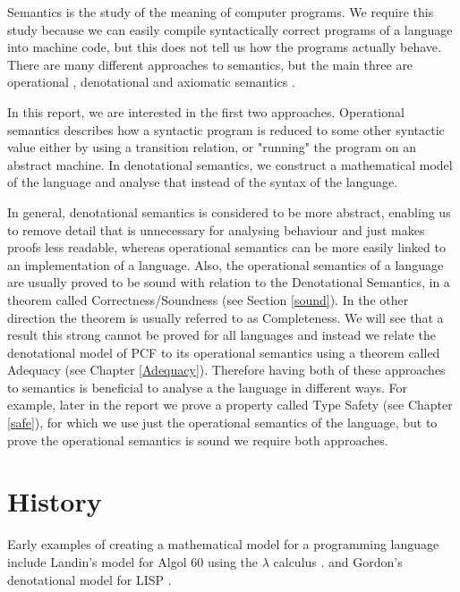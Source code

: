 Semantics is the study of the meaning of computer programs. We require this study because we can easily compile syntactically correct programs  of a language into machine code, but this does not tell us how the programs actually behave. There are many different approaches to semantics, but the main three are operational \citep{Plotkin81}, denotational \citep{Scott93} and axiomatic semantics \citep{Hoare69}.

In this report, we are interested in the first two approaches. Operational semantics describes how a syntactic program is reduced to some other syntactic value either by using a transition relation, or "running" the program on an abstract machine. In denotational semantics, we construct a mathematical model of the language and analyse that instead of the syntax of the language.

In general, denotational semantics is considered to be more abstract, enabling us to remove detail that is unnecessary for analysing behaviour and just makes proofs less readable,  whereas operational semantics can be more easily linked to an implementation of a language. Also, the operational semantics of a language are usually proved to be sound with relation to the Denotational Semantics, in a theorem called Correctness/Soundness (see Section \ref{sound}). In the other direction the theorem is usually referred to as Completeness. We will see that a result this strong cannot be proved for all languages and instead we relate the denotational model of PCF to its operational semantics using a theorem called Adequacy (see Chapter \ref{Adequacy}). Therefore having both of these approaches to semantics is beneficial to analyse a the language in different ways. For example, later in the report we prove a property called Type Safety (see Chapter \ref{safe}), for which we use just the operational semantics of the language, but to prove the operational semantics is sound we require both approaches.

\section{History}
Early examples of creating a mathematical model for a programming language include Landin's model for Algol 60 using the $\lambda$ calculus \citep{Landin64,Landin65}.
and Gordon's denotational model for LISP \citep{Gordon73}.



